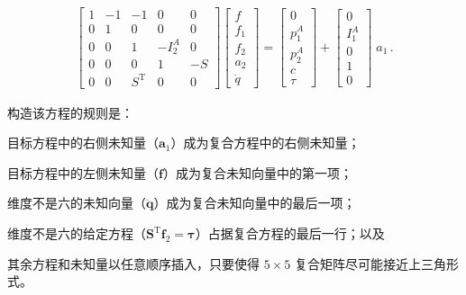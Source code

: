 \documentclass[10pt,a4paper]{book}
\theoremstyle{thmstyle} %
\theoremstyle{defstyle} %
\theoremstyle{prostyle} %
\begin{document}
$$
\begin{array}{r} { \left[ \begin{array}{lllll} { 1 } & { - 1 } & { - 1 } & { 0 } & { 0 } \\{ 0 } & { 1 } & { 0 } & { 0 } & { 0 } \\{ 0 } & { 0 } & { 1 } & { - I _ { 2 } ^{A} } & { 0 } \\{ 0 } & { 0 } & { 0 } & { 1 } & { - S } \\{ 0 } & { 0 } & { S ^{\mathrm { T} } } & { 0 } & { 0 } \end{array} \right] \left[ \begin{array}{l} { f } \\{ f _ { 1 } } \\{ f _ { 2 } } \\{ a _ { 2 } } \\{ \ddot { q } } \end{array} \right] = \left[ \begin{array}{l} { 0 } \\{ p _ { 1 } ^{A} } \\{ p _ { 2 } ^{A} } \\{ c } \\{ \tau } \end{array} \right] + \left[ \begin{array}{l} { 0 } \\{ I _ { 1 } ^{A} } \\{ 0 } \\{ 1 } \\{ 0 } \end{array} \right] \; a _ { 1 } \, . } \end{array}
$$



构造该方程的规则是：



目标方程中的右侧未知量（$\boldsymbol{a}_{1}$）成为复合方程中的右侧未知量；



目标方程中的左侧未知量（$\boldsymbol{f}$）成为复合未知向量中的第一项；



维度不是六的未知向量（$\ddot{\boldsymbol{q}}$）成为复合未知向量中的最后一项；



维度不是六的给定方程（$\boldsymbol{S}^{\mathrm{T}}\boldsymbol{f}_{2}=\boldsymbol{\tau}$）占据复合方程的最后一行；以及



其余方程和未知量以任意顺序插入，只要使得 $5\times5$ 复合矩阵尽可能接近上三角形式。
\end{document}
